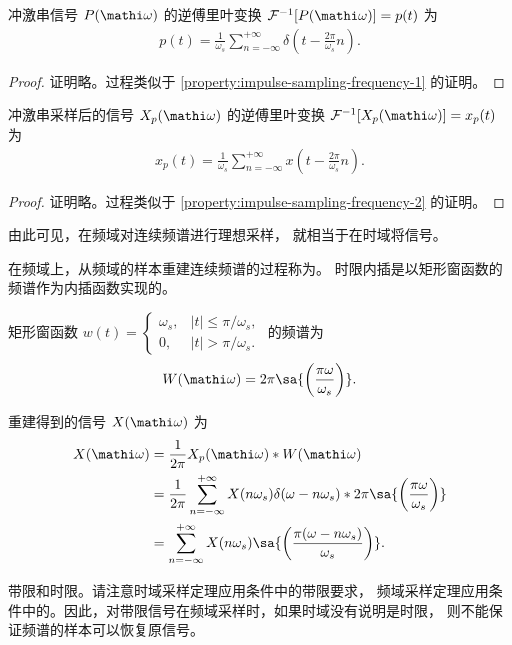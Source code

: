 \begin{property}
    冲激串信号 $P(\mathi\omega)$ 的逆傅里叶变换 $\mathcal{F}^{-1}[P(\mathi\omega)] = p(t)$ 为
    \begin{align*}
        p(t) = \frac{1}{\omega_s}\sum_{n = -\infty}^{+\infty}\delta(t - \frac{2\pi}{\omega_s}n).
    \end{align*}
\end{property}

\begin{proof}
    证明略。过程类似于 \ref{property:impulse-sampling-frequency-1} 的证明。
\end{proof}

\begin{property}
    冲激串采样后的信号 $X_p(\mathi\omega)$ 的逆傅里叶变换 $\mathcal{F}^{-1}[X_p(\mathi\omega)] = x_p(t)$ 为
    \begin{align*}
        x_p(t) = \frac{1}{\omega_s}\sum_{n = -\infty}^{+\infty}x(t - \frac{2\pi}{\omega_s}n).
    \end{align*}
\end{property}

\begin{proof}
    证明略。过程类似于 \ref{property:impulse-sampling-frequency-2} 的证明。
\end{proof}

\begin{remark}
    由此可见，在频域对连续频谱进行理想采样，
    就相当于在时域将信号。
\end{remark}

\begin{definition}[时限内插]
    在频域上，从频域的样本重建连续频谱的过程称为。
    时限内插是以矩形窗函数的频谱作为内插函数实现的。

    矩形窗函数 $w(t) = \begin{cases}
        \omega_s, & |t| \le \pi/\omega_s, \\
        0, & |t| > \pi/\omega_s.
    \end{cases}$ 的频谱为
    \begin{align*}
        W(\mathi\omega) = 2\pi \sa{\left(\frac{\pi\omega}{\omega_s}\right)}.
    \end{align*}

    重建得到的信号 $X(\mathi\omega)$ 为
    \begin{align*}
        X(\mathi\omega) & = \frac{1}{2\pi}X_p(\mathi\omega) * W(\mathi\omega) \\
        & = \frac{1}{2\pi} \sum_{n = -\infty}^{+\infty}X(n\omega_s)\delta(\omega - n\omega_s) * 2\pi\sa{\left(\frac{\pi\omega}{\omega_s}\right)} \\
        & = \sum_{n = -\infty}^{+\infty}X(n\omega_s)\sa{\left(\frac{\pi(\omega - n\omega_s)}{\omega_s}\right)}.
    \end{align*}
\end{definition}

\begin{note}
    带限和时限。请注意时域采样定理应用条件中的{带限要求}，
    频域采样定理应用条件中的。因此，对带限信号在频域采样时，如果时域没有说明是时限，
    则不能保证频谱的样本可以恢复原信号。
\end{note}
